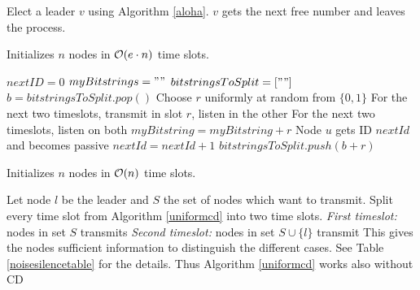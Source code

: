 \documentclass[11pt, oneside]{book}   						%
\begin{document}
\begin{algorithm}
\caption{}\label{nonuniform}
\begin{algorithmic}[1]
\Repeat
	\State Elect a leader $v$ using Algorithm \ref{aloha}.
	\State $v$ gets the next free number and leaves the process.
\end{algorithmic}
\end{algorithm}
\begin{mythm} Initializes $n$ nodes in $\mathcal{O}(e\cdot n)$ time slots.\end{mythm}

\begin{algorithm}[H]
\caption{}\label{uniformcd}
\begin{algorithmic}[1]
\State $nextID = 0$
\ForEach[node $v$]
	\State $myBitstrings = ""$
	\State $bitstringsToSplit = [""]$
		\State $b=bitstringsToSplit.pop()$
		\Repeat
				\State Choose $r$ uniformly at random from $\{0,1\}$
				\State For the next two timeslots, transmit in slot $r$, listen in the other
			\Else
				\State For the next two timeslots, listen on both
			\EndIf
			\State $myBitstring = myBitstring+r$
		\EndIf
				\State Node $u$ gets ID $nextId$ and becomes passive
				\State $nextId=nextId +1$
			\Else
				\State $bitstringsToSplit.push(b+r)$
			\EndIf
		\EndFor
	\EndWhile
\EndForEach
\end{algorithmic}
\end{algorithm}
\begin{mythm} Initializes $n$ nodes in $\mathcal{O}(n)$ time slots.\end{mythm}

\begin{algorithm}
\caption{}\label{uniform}
\begin{algorithmic}[1]
\State Let node $l$ be the leader and $S$ the set of nodes which want to transmit.
\State Split every time slot from Algorithm \ref{uniformcd} into two time slots.
\State \textit{First timeslot:} nodes in set $S$ transmits
\State \textit{Second timeslot:} nodes in set $S\cup \{l\}$ transmit
\State This gives the nodes sufficient information to distinguish the different cases. See Table \ref{noisesilencetable} for the details.
\State Thus Algorithm \ref{uniformcd} works also without CD
\end{algorithmic}
\end{algorithm}
\end{document}
